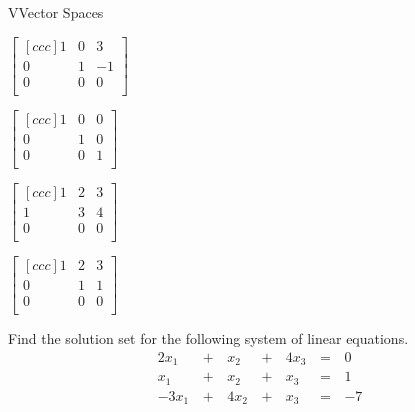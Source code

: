 \documentclass{article}[12pt]
\begin{document}
\begin{module}{V}{Vector Spaces}
\begin{readinessAssuranceTest}
    \begin{multicols}{4}
    \begin{readinessAssuranceTestChoices}
    \item
      \(
        \begin{bmatrix}[ccc]
          1 & 0 & 3 \\
          0 & 1 & -1 \\
          0 & 0 & 0 \\
        \end{bmatrix}
      \)
    \item
      \(
        \begin{bmatrix}[ccc]
          1 & 0 & 0 \\
          0 & 1 & 0 \\
          0 & 0 & 1 \\
        \end{bmatrix}
      \) %
    \item
      \(
        \begin{bmatrix}[ccc]
          1 & 2 & 3 \\
          1 & 3 & 4 \\
          0 & 0 & 0 \\
        \end{bmatrix}
      \)
    \item
      \(
        \begin{bmatrix}[ccc]
          1 & 2 & 3 \\
          0 & 1 & 1 \\
          0 & 0 & 0 \\
        \end{bmatrix}
      \)
    \end{readinessAssuranceTestChoices}
    \end{multicols}

    \item Find the solution set for the following system of linear equations.
    \begin{alignat*}{4}
      2x_1 &\,+\,& x_2 &\,+\,& 4x_3 &\,=\,& 0 \\
       x_1 &\,+\,& x_2 &\,+\,&  x_3 &\,=\,& 1 \\
     -3x_1 &\,+\,& 4x_2 &\,+\,& x_3 &\,=\,& -7 \\
    \end{alignat*}


\end{readinessAssuranceTest}
\end{module}
\end{document}
